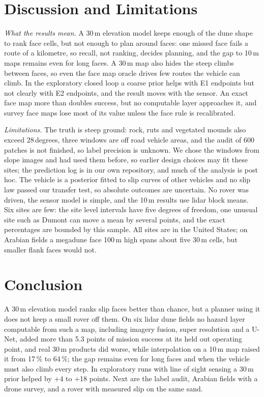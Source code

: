 \documentclass[conference]{IEEEtran}
\begin{document}
\section{Discussion and Limitations}
\label{sec:limits}
\textit{What the results mean.} A 30\,m elevation model keeps enough of the dune shape to rank face cells, but not enough to plan around faces: one missed face fails a route of a kilometre, so recall, not ranking, decides planning, and the gap to 10\,m maps remains even for long faces. A 30\,m map also hides the steep climbs between faces, so even the face map oracle drives few routes the vehicle can climb. In the exploratory closed loop a coarse prior helps with E1 endpoints but not clearly with E2 endpoints, and the result moves with the sensor. An exact face map more than doubles success, but no computable layer approaches it, and survey face maps lose most of its value unless the face rule is recalibrated.

\textit{Limitations.} The truth is steep ground: rock, ruts and vegetated mounds also exceed 28\,degrees, three windows are off road vehicle areas, and the audit of 600 patches is not finished, so label precision is unknown. We chose the windows from slope images and had used them before, so earlier design choices may fit these sites; the prediction log is in our own repository, and much of the analysis is post hoc. The vehicle is a posterior fitted to slip curves of other vehicles and no slip law passed our transfer test, so absolute outcomes are uncertain. No rover was driven, the sensor model is simple, and the 10\,m results use lidar block means. Six sites are few: the site level intervals have five degrees of freedom, one unusual site such as Dumont can move a mean by several points, and the exact percentages are bounded by this sample. All sites are in the United States; on Arabian fields a megadune face 100\,m high spans about five 30\,m cells, but smaller flank faces would not.

\section{Conclusion}
A 30\,m elevation model ranks slip faces better than chance, but a planner using it does not keep a small rover off them. On six lidar dune fields no hazard layer computable from such a map, including imagery fusion, super resolution and a U-Net, added more than 5.3 points of mission success at its held out operating point, and real 30\,m products did worse, while interpolation on a 10\,m map raised it from 17\,\% to 64\,\%; the gap remains even for long faces and when the vehicle must also climb every step. In exploratory runs with line of sight sensing a 30\,m prior helped by +4 to +18 points. Next are the label audit, Arabian fields with a drone survey, and a rover with measured slip on the same sand.
\end{document}
